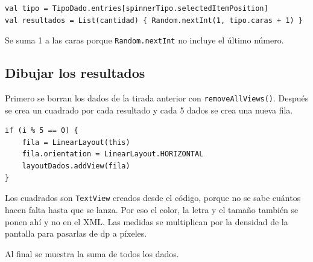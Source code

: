 \begin{lstlisting}
val tipo = TipoDado.entries[spinnerTipo.selectedItemPosition]
val resultados = List(cantidad) { Random.nextInt(1, tipo.caras + 1) }
\end{lstlisting}

Se suma 1 a las caras porque \texttt{Random.nextInt} no incluye el último número.

\subsection{Dibujar los resultados}
Primero se borran los dados de la tirada anterior con \texttt{removeAllViews()}.
Después se crea un cuadrado por cada resultado y cada 5 dados se crea una nueva fila.

\begin{lstlisting}
if (i % 5 == 0) {
    fila = LinearLayout(this)
    fila.orientation = LinearLayout.HORIZONTAL
    layoutDados.addView(fila)
}
\end{lstlisting}

Los cuadrados son \texttt{TextView} creados desde el código, porque no se sabe cuántos hacen falta hasta que se lanza.
Por eso el color, la letra y el tamaño también se ponen ahí y no en el XML.
Las medidas se multiplican por la densidad de la pantalla para pasarlas de dp a píxeles.

Al final se muestra la suma de todos los dados.